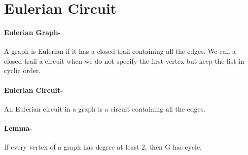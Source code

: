 \section{Eulerian Circuit}

\paragraph{Eulerian Graph-}A graph is Eulerian if it has a closed trail containing all
the edges. We call a closed trail a circuit when we do not specify the
first vertex but keep the list in cyclic order.

\paragraph{Eulerian Circuit-}An Eulerian circuit in a graph is a circuit containing all the
edges.

\paragraph{Lemma-}If every vertex of a graph has degree at least 2, then G
has cycle.

